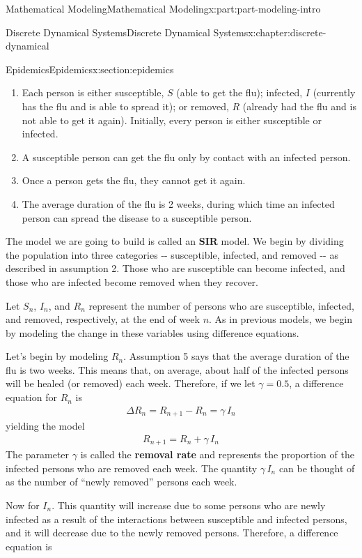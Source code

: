 \documentclass[oneside,10pt,]{book}
\newcommand{\terminology}[1]{\textbf{#1}}
\numberwithin{equation}{section}
\begin{document}
\begin{partptx}{Mathematical Modeling}{}{Mathematical Modeling}{}{}{x:part:part-modeling-intro}
\begin{chapterptx}{Discrete Dynamical Systems}{}{Discrete Dynamical Systems}{}{}{x:chapter:discrete-dynamical}
\begin{sectionptx}{Epidemics}{}{Epidemics}{}{}{x:section:epidemics}
\begin{introduction}{}
\begin{enumerate}
\item{}Each person is either susceptible, \(S\) (able to get the flu); infected, \(I\) (currently has the flu and is able to spread it); or removed, \(R\) (already had the flu and is not able to get it again).  Initially, every person is either susceptible or infected.%
\item{}A susceptible person can get the flu only by contact with an infected person.%
\item{}Once a person gets the flu, they cannot get it again.%
\item{}The average duration of the flu is 2 weeks, during which time an infected person can spread the disease to a susceptible person.%
\end{enumerate}
The model we are going to build is called an \terminology{SIR} model.  We begin by dividing the population into three categories -{}-{} susceptible, infected, and removed -{}-{} as described in assumption 2.  Those who are susceptible can become infected, and those who are infected become removed when they recover.%
\par
Let \(S_n\), \(I_n\), and \(R_n\) represent the number of persons who are susceptible, infected, and removed, respectively, at the end of week \(n\).  As in previous models, we begin by modeling the change in these variables using difference equations.%
\par
Let's begin by modeling \(R_n\).  Assumption 5 says that the average duration of the flu is two weeks.  This means that, on average, about half of the infected persons will be healed (or removed) each week.  Therefore, if we let \(\gamma = 0.5\), a difference equation for \(R_n\) is%
%
\begin{gather}
\Delta R_n = R_{n+1} - R_n = \gamma\,I_n\label{x:mrow:removedeqn}
\end{gather}
yielding the model%
%
\begin{gather}
R_{n+1} = R_n + \gamma\,I_n\label{x:mrow:removedeqn2}
\end{gather}
The parameter \(\gamma\) is called the \terminology{removal rate} and represents the proportion of the infected persons who are removed each week.  The quantity \(\gamma\,I_n\) can be thought of as the number of ``newly removed'' persons each week.%
\par
Now for \(I_n\).  This quantity will increase due to some persons who are newly infected as a result of the interactions between susceptible and infected persons, and it will decrease due to the newly removed persons.  Therefore, a difference equation is%

\end{introduction}
\end{sectionptx}
\end{chapterptx}
\end{partptx}
\end{document}
